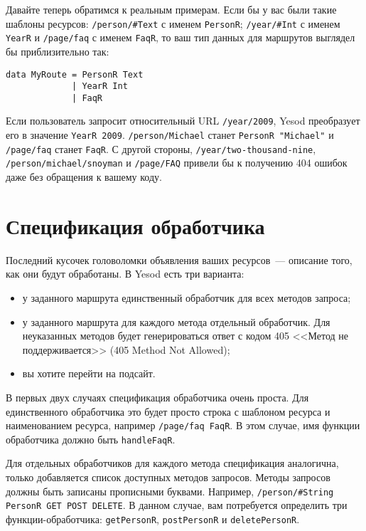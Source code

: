Давайте теперь обратимся к реальным примерам. Если бы у вас были такие
шаблоны ресурсов: \lstinline!/person/#Text! с именем
\lstinline!PersonR!; \lstinline!/year/#Int! с именем
\lstinline!YearR! и \lstinline!/page/faq! с именем \lstinline!FaqR!,
то ваш тип данных для маршрутов выглядел бы приблизительно так:
\begin{lstlisting}
data MyRoute = PersonR Text
             | YearR Int
             | FaqR
\end{lstlisting}

Если пользователь запросит относительный URL \lstinline!/year/2009!,
Yesod преобразует его в значение \lstinline!YearR 2009!.
\lstinline!/person/Michael! станет \lstinline!PersonR "Michael"!
и \lstinline!/page/faq! станет \lstinline!FaqR!. С другой
стороны, \lstinline!/year/two-thousand-nine!,
\lstinline!/person/michael/snoyman! и \lstinline!/page/FAQ! привели бы
к получению 404 ошибок даже без обращения к вашему коду.

\section{Спецификация обработчика}
Последний кусочек головоломки объявления ваших ресурсов~--- описание
того, как они будут обработаны. В Yesod есть три варианта:
\begin{itemize}
\item у заданного маршрута единственный обработчик для всех методов запроса;
\item у заданного маршрута для каждого метода отдельный
  обработчик. Для неуказанных методов будет генерироваться ответ с
  кодом 405 <<Метод не поддерживается>> (405 Method Not
  Allowed);
\item вы хотите перейти на подсайт.
\end{itemize}

В первых двух случаях спецификация обработчика очень проста. Для
единственного обработчика это будет просто строка с шаблоном ресурса и
наименованием ресурса, например \lstinline!/page/faq FaqR!. В этом
случае, имя функции обработчика должно быть \lstinline!handleFaqR!.

Для отдельных обработчиков для каждого метода спецификация аналогична,
только добавляется список доступных методов запросов. Методы запросов
должны быть записаны прописными буквами. Например,
\lstinline!/person/#String PersonR GET POST DELETE!.
В данном случае, вам потребуется определить три функции-обработчика:
\lstinline!getPersonR!, \lstinline!postPersonR! и \lstinline!deletePersonR!.

